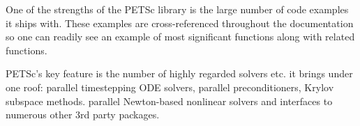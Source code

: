 \documentclass{article}
\begin{document}
One of the strengths of the PETSc library is the large number of code examples it ships with. These examples are cross-referenced throughout the documentation so one can readily see an example of most significant functions along with related functions.

PETSc’s key feature is the number of highly regarded solvers etc. it brings under one roof: parallel timestepping ODE solvers, parallel preconditioners, Krylov subspace methods. parallel Newton-based nonlinear solvers and interfaces to numerous other 3rd party packages.

% 
% 
% 
% 
% 
% 
\end{document}
